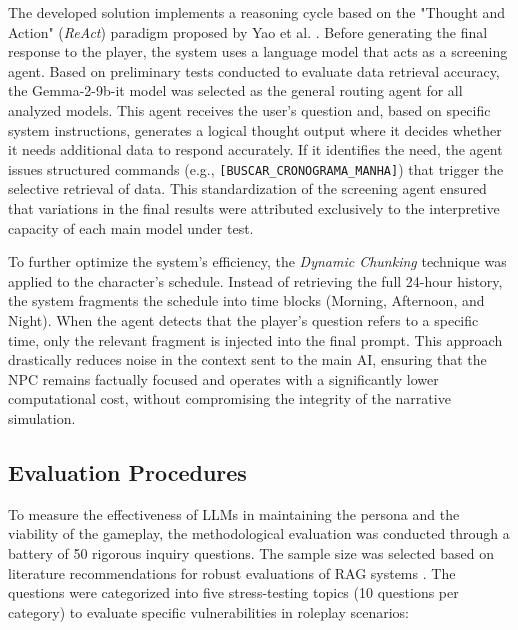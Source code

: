 \documentclass[12pt]{article}
\begin{document}
The developed solution implements a reasoning cycle based on the "Thought and Action" (\textit{ReAct}) paradigm proposed by Yao et al. \cite{yao2022react}. Before generating the final response to the player, the system uses a language model that acts as a screening agent. Based on preliminary tests conducted to evaluate data retrieval accuracy, the Gemma-2-9b-it model was selected as the general routing agent for all analyzed models. This agent receives the user's question and, based on specific system instructions, generates a logical thought output where it decides whether it needs additional data to respond accurately. If it identifies the need, the agent issues structured commands (e.g., \texttt{[BUSCAR\_CRONOGRAMA\_MANHA]}) that trigger the selective retrieval of data. This standardization of the screening agent ensured that variations in the final results were attributed exclusively to the interpretive capacity of each main model under test.

To further optimize the system's efficiency, the \textit{Dynamic Chunking} technique was applied to the character's schedule. Instead of retrieving the full 24-hour history, the system fragments the schedule into time blocks (Morning, Afternoon, and Night). When the agent detects that the player's question refers to a specific time, only the relevant fragment is injected into the final prompt. This approach drastically reduces noise in the context sent to the main AI, ensuring that the NPC remains factually focused and operates with a significantly lower computational cost, without compromising the integrity of the narrative simulation.

\subsection{Evaluation Procedures}

To measure the effectiveness of LLMs in maintaining the persona and the viability of the gameplay, the methodological evaluation was conducted through a battery of 50 rigorous inquiry questions. The sample size was selected based on literature recommendations for robust evaluations of RAG systems \cite{es2023ragas}. The questions were categorized into five stress-testing topics (10 questions per category) to evaluate specific vulnerabilities in roleplay scenarios:
\end{document}
